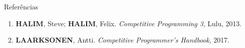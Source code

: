 \begin{frame}[fragile]{Referências}

    \begin{enumerate}
        \item \textbf{HALIM}, Steve; \textbf{HALIM}, Felix. \textit{Competitive Programming 3}, Lulu, 2013.

        \item \textbf{LAARKSONEN}, Antti. \textit{Competitive Programmer's Handbook}, 2017.

    \end{enumerate}

\end{frame}
